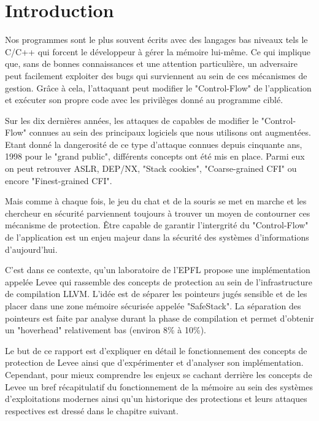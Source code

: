 \chapter{Introduction}
\label{chap:introduction}

Nos programmes sont le plus souvent écrits avec des langages bas niveaux tels le C/C++ qui forcent le développeur à gérer la mémoire lui-même. Ce qui implique que, sans de bonnes connaissances et une attention particulière, un adversaire peut facilement exploiter des bugs qui surviennent au sein de ces mécanismes de gestion. Grâce à cela, l’attaquant peut modifier le "Control-Flow" de l'application et exécuter son propre code avec les privilèges donné au programme ciblé.

Sur les dix dernières années, les attaques de capables de modifier le "Control-Flow" connues au sein des principaux logiciels que nous utilisons ont augmentées. Etant donné la dangerosité de ce type d’attaque connues depuis cinquante ans, 1998 pour le "grand public", différents concepts ont été mis en place. Parmi eux on peut retrouver ASLR, DEP/NX, "Stack cookies", "Coarse-grained CFI" ou encore "Finest-grained CFI".

Mais comme à chaque fois, le jeu du chat et de la souris se met en marche et les chercheur en sécurité parviennent toujours à trouver un moyen de contourner ces mécanisme de protection. Être capable de garantir l'intergrité du "Control-Flow" de l'application est un enjeu majeur dans la sécurité des systèmes d'informations d'aujourd'hui.

C'est dans ce contexte, qu'un laboratoire de l’EPFL propose une implémentation appelée Levee qui rassemble des concepts de protection au sein de l’infrastructure de compilation LLVM. L’idée est de séparer les pointeurs jugés sensible et de les placer dans une zone mémoire sécurisée appelée "SafeStack". La séparation des pointeurs est faite par analyse durant la phase de compilation et permet d’obtenir un "hoverhead" relativement bas (environ 8\% à 10\%).

Le but de ce rapport est d’expliquer en détail le fonctionnement des concepts de protection de Levee ainsi que d’expérimenter et d’analyser son implémentation. Cependant, pour mieux comprendre les enjeux se cachant derrière les concepts de Levee un bref récapitulatif du fonctionnement de la mémoire au sein des systèmes d'exploitations modernes ainsi qu'un historique des protections et leurs attaques respectives est dressé dans le chapitre suivant.
